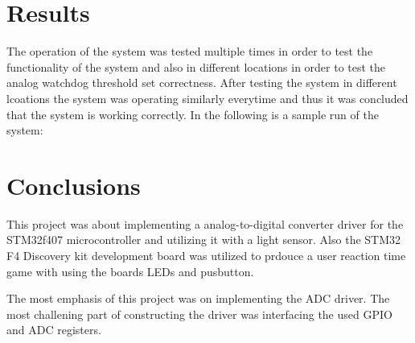 \section{Results}
The operation of the system was tested multiple times in order to test the functionality of the system and also in different locations in order to test the analog watchdog threshold set correctness. After testing the system in different lcoations the system was operating similarly everytime and thus it was concluded that the system is working correctly. In the following is a sample run of the system:

\section{Conclusions}
This project was about implementing a analog-to-digital converter driver for the STM32f407 microcontroller and utilizing it with a light sensor. Also the STM32 F4 Discovery kit development board was utilized to prdouce a user reaction time game with using the boards LEDs and pusbutton.\\
\par
The most emphasis of this project was on implementing the ADC driver. The most challening part of constructing the driver was interfacing the used GPIO and ADC registers.
